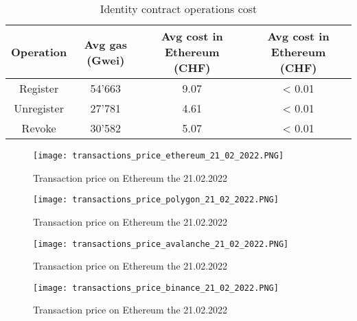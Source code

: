 \documentclass[a4paper,11pt,oneside]{report}
\begin{document}
\begin{table}[h!]
\begin{center}
\begin{NiceTabular}{ |c||c|c|c| }
 \hline
 Operation & Avg gas (Gwei) & Avg cost in Ethereum (CHF) & Avg cost in Ethereum (CHF) \\
 \hline \hline
 Register & 54'663 & 9.07 & < 0.01 \\
 Unregister & 27'781 & 4.61 & < 0.01 \\
 Revoke & 30'582 & 5.07 & < 0.01 \\
 \hline
\end{NiceTabular}
\caption{Identity contract operations cost}
\label{table:identity_contract_operations_cost}
\end{center}
\end{table}



\begin{center}
\begin{figure}[h!] 
  \texttt{[image: transactions\_price\_ethereum\_21\_02\_2022.PNG]}
  \caption{Transaction price on Ethereum the 21.02.2022}
  \label{fig:transactions_price_ethereum_21_02_2022}
\end{figure}
\end{center}

\begin{center}
\begin{figure}[h!] 
  \texttt{[image: transactions\_price\_polygon\_21\_02\_2022.PNG]}
  \caption{Transaction price on Ethereum the 21.02.2022}
  \label{fig:transactions_price_polygon_21_02_2022}
\end{figure}
\end{center}

\begin{center}
\begin{figure}[h!] 
  \texttt{[image: transactions\_price\_avalanche\_21\_02\_2022.PNG]}
  \caption{Transaction price on Ethereum the 21.02.2022}
  \label{fig:transactions_price_avalanche_21_02_2022}
\end{figure}
\end{center}

\begin{center}
\begin{figure}[h!] 
  \texttt{[image: transactions\_price\_binance\_21\_02\_2022.PNG]}
  \caption{Transaction price on Ethereum the 21.02.2022}
  \label{fig:transactions_price_binance_21_02_2022}
\end{figure}
\end{center}
\end{document}
